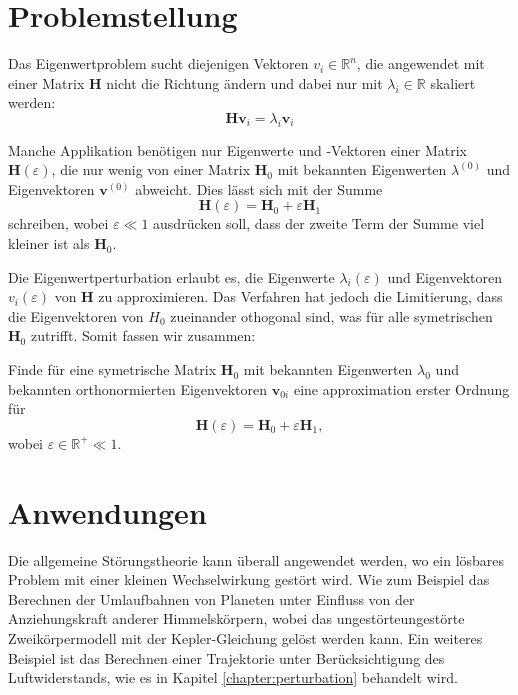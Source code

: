 %
%
\section{Problemstellung
\label{ew:section:problemstellung}}

Das Eigenwertproblem sucht diejenigen Vektoren $v_i \in \mathbb{R}^{n} $, die angewendet mit einer Matrix $\bm H$ nicht die Richtung ändern und dabei nur mit $\lambda_i \in \mathbb{R}$ skaliert werden:
\begin{equation}
    \bm H \bm v_i = \lambda_i \bm v_i \label{ew:eq:eig}
\end{equation}

Manche Applikation benötigen nur Eigenwerte und -Vektoren einer Matrix $\bm H(\varepsilon)$, die nur wenig von einer Matrix $\bm H_0$ mit bekannten Eigenwerten $\lambda^{(0)}$ und Eigenvektoren $\bm v^{(0)}$ abweicht.
Dies lässt sich mit der Summe
\begin{equation}
    \bm H(\varepsilon) = \bm H_0 + \varepsilon \bm H_1
\end{equation}
schreiben, wobei $\varepsilon \ll 1 $ ausdrücken soll, dass der zweite Term der Summe viel kleiner ist als $\bm H_0$.

Die Eigenwertperturbation erlaubt es, die Eigenwerte $\lambda_i(\varepsilon)$ und Eigenvektoren  $v_i(\varepsilon)$ von $\bm H$ zu approximieren.
Das Verfahren hat jedoch die Limitierung, dass die Eigenvektoren von $H_0$ zueinander othogonal sind, was für alle symetrischen $\bm H_0$ zutrifft.
Somit fassen wir zusammen:
\begin{aufgabe}
Finde für eine symetrische Matrix $\bm H_0$ mit bekannten Eigenwerten $\lambda_{0}$ und bekannten orthonormierten Eigenvektoren $\bm v_{0i}$ eine approximation erster Ordnung für
\begin{equation*}
    \bm H(\varepsilon) = \bm H_0 + \varepsilon \bm H_1,
\end{equation*}
wobei $\varepsilon \in \mathbb{R^+} \ll 1$.
\end{aufgabe}

\section{Anwendungen}

Die allgemeine Störungstheorie kann überall angewendet werden, wo ein lösbares Problem mit einer kleinen Wechselwirkung gestört wird.
Wie zum Beispiel das Berechnen der Umlaufbahnen von Planeten unter Einfluss von der Anziehungskraft anderer Himmelskörpern, wobei das ungestörteungestörte Zweikörpermodell mit der Kepler-Gleichung gelöst werden kann.  
Ein weiteres Beispiel ist das Berechnen einer Trajektorie unter Berücksichtigung des Luftwiderstands, wie es in Kapitel \ref{chapter:perturbation} behandelt wird.

